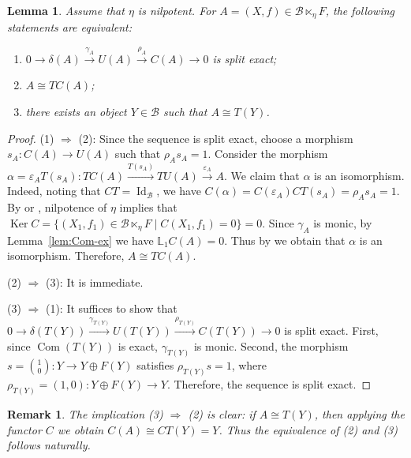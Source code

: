 \documentclass[11pt,reqno]{amsart}
\numberwithin{equation}{section}
\newtheorem{lemma}[theorem]{Lemma}
\newtheorem{remark}[theorem]{Remark}
\newcommand{\cB}{\mathcal B}
\newcommand{\Ker}{\operatorname{Ker}}
\newcommand{\Com}{\operatorname{Com}}
\newcommand{\Id}{\operatorname{Id}}
\begin{document}
\begin{lemma}\label{lem:T-equi}
Assume that $\eta$ is nilpotent. For $A=(X,f)\in \cB\ltimes_\eta F$, the following statements are equivalent:
\begin{enumerate}[label=\textup{(\arabic*)}]
\item $0\rightarrow \delta(A)\xrightarrow{\gamma_A} U(A)\xrightarrow{\rho_A} C(A)\rightarrow 0$ is split exact;
\item $A\cong TC(A)$;
\item there exists an object $Y\in \cB$ such that $A\cong T(Y)$.
\end{enumerate}
\end{lemma}
\begin{proof}
{\rm (1) $\Rightarrow$ (2):} Since the sequence is split exact, choose a morphism $s_A:C(A)\rightarrow U(A)$ such that $\rho_As_A=1$. Consider the morphism
$\alpha=\varepsilon_AT(s_A)\colon TC(A)\xrightarrow{T(s_A)}TU(A)\xrightarrow{\varepsilon_A}A$. We claim that $\alpha$ is an isomorphism. Indeed, noting that $CT=\Id_{\cB}$, we have
$C(\alpha)=C(\varepsilon_A)CT(s_A)=\rho_As_A=1$. By \cite[Lemma~2.3]{Marmaridis} or \cite[Lemma 5.3]{Beligiannis}, nilpotence of $\eta$ implies that $\Ker C=\{(X_1,f_1)\in \cB\ltimes_\eta F\mid
C(X_1,f_1)=0\}=0$. Since $\gamma_A$ is monic, by Lemma~\ref{lem:Com-ex} we have $\mathbb{L}_1C(A)=0$. Thus by \cite[Corollary~5.10 (i),(iii)]{Beligiannis} we obtain that $\alpha$ is an isomorphism.
Therefore, $A\cong TC(A)$.

{\rm (2) $\Rightarrow$ (3):} It is immediate.

{\rm (3) $\Rightarrow$ (1):} It suffices to show that $0\rightarrow \delta(T(Y))\xrightarrow{\gamma_{T(Y)}} U(T(Y))\xrightarrow{\rho_{T(Y)}} C(T(Y))\rightarrow 0$
is split exact. First, since $\Com(T(Y))$ is exact, $\gamma_{T(Y)}$ is monic. Second,
the morphism $s=\binom{1}{0}\colon Y\to Y\oplus F(Y)$ satisfies $\rho_{T(Y)}s=1$, where $\rho_{T(Y)}=(1,0)\colon Y\oplus F(Y)\to Y$. Therefore, the sequence is split exact.
\end{proof}
\begin{remark}
{\rm The implication (3) $\Rightarrow$ (2) is clear: if $A\cong T(Y)$, then applying the functor $C$ we obtain $C(A)\cong CT(Y)=Y$. Thus the equivalence of (2) and (3) follows naturally.}
\end{remark}
\end{document}
